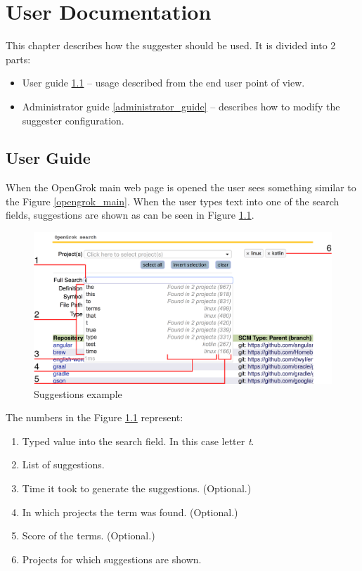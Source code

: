 \chapter{User Documentation}
\label{chap:user}

This chapter describes how the suggester should be used. It is divided into 2 parts:
\begin{itemize}
    \item User guide \ref{user_guide} – usage described from the end user point of view.
    \item Administrator guide \ref{administrator_guide} – describes how to modify the suggester configuration.
\end{itemize}

\section{User Guide}
\label{user_guide}
When the OpenGrok main web page is opened the user sees something similar to the Figure \ref{opengrok_main}.
When the user types text into one of the search fields, suggestions are shown as can be seen in Figure \ref{suggestions_pic}.

\begin{figure}[htbp]
    \centering
    \includegraphics[width=145mm]{../img/suggestions_pic.png}
    \caption{Suggestions example}
    \label{suggestions_pic}
\end{figure}

The numbers in the Figure \ref{suggestions_pic} represent:
\begin{enumerate}
    \item Typed value into the search field. In this case letter \textit{t}.
    \item List of suggestions.
    \item Time it took to generate the suggestions. (Optional.)
    \item In which projects the term was found. (Optional.)
    \item Score of the terms. (Optional.)
    \item Projects for which suggestions are shown.
\end{enumerate}

